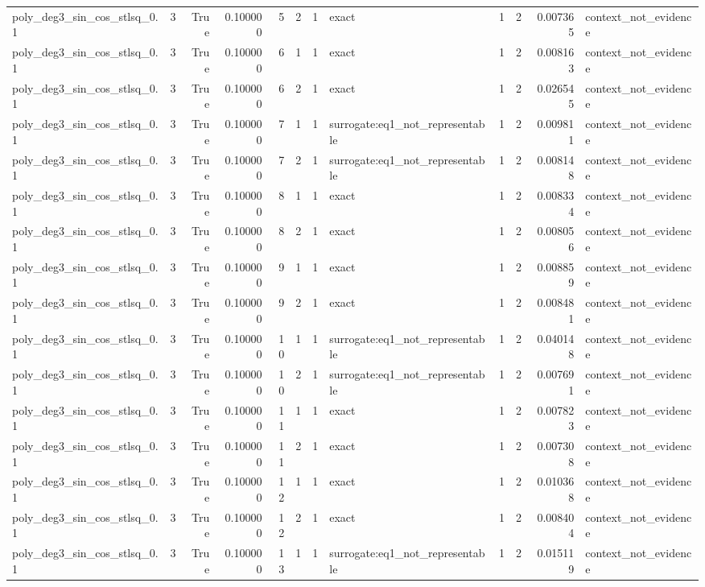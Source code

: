 \begin{tabular}{lrrrrrrlrrrl}
poly\_deg3\_sin\_cos\_stlsq\_0.1 & 3 & True & 0.100000 & 5 & 2 & 1 & exact & 1 & 2 & 0.007365 & context\_not\_evidence \\
poly\_deg3\_sin\_cos\_stlsq\_0.1 & 3 & True & 0.100000 & 6 & 1 & 1 & exact & 1 & 2 & 0.008163 & context\_not\_evidence \\
poly\_deg3\_sin\_cos\_stlsq\_0.1 & 3 & True & 0.100000 & 6 & 2 & 1 & exact & 1 & 2 & 0.026545 & context\_not\_evidence \\
poly\_deg3\_sin\_cos\_stlsq\_0.1 & 3 & True & 0.100000 & 7 & 1 & 1 & surrogate:eq1\_not\_representable & 1 & 2 & 0.009811 & context\_not\_evidence \\
poly\_deg3\_sin\_cos\_stlsq\_0.1 & 3 & True & 0.100000 & 7 & 2 & 1 & surrogate:eq1\_not\_representable & 1 & 2 & 0.008148 & context\_not\_evidence \\
poly\_deg3\_sin\_cos\_stlsq\_0.1 & 3 & True & 0.100000 & 8 & 1 & 1 & exact & 1 & 2 & 0.008334 & context\_not\_evidence \\
poly\_deg3\_sin\_cos\_stlsq\_0.1 & 3 & True & 0.100000 & 8 & 2 & 1 & exact & 1 & 2 & 0.008056 & context\_not\_evidence \\
poly\_deg3\_sin\_cos\_stlsq\_0.1 & 3 & True & 0.100000 & 9 & 1 & 1 & exact & 1 & 2 & 0.008859 & context\_not\_evidence \\
poly\_deg3\_sin\_cos\_stlsq\_0.1 & 3 & True & 0.100000 & 9 & 2 & 1 & exact & 1 & 2 & 0.008481 & context\_not\_evidence \\
poly\_deg3\_sin\_cos\_stlsq\_0.1 & 3 & True & 0.100000 & 10 & 1 & 1 & surrogate:eq1\_not\_representable & 1 & 2 & 0.040148 & context\_not\_evidence \\
poly\_deg3\_sin\_cos\_stlsq\_0.1 & 3 & True & 0.100000 & 10 & 2 & 1 & surrogate:eq1\_not\_representable & 1 & 2 & 0.007691 & context\_not\_evidence \\
poly\_deg3\_sin\_cos\_stlsq\_0.1 & 3 & True & 0.100000 & 11 & 1 & 1 & exact & 1 & 2 & 0.007823 & context\_not\_evidence \\
poly\_deg3\_sin\_cos\_stlsq\_0.1 & 3 & True & 0.100000 & 11 & 2 & 1 & exact & 1 & 2 & 0.007308 & context\_not\_evidence \\
poly\_deg3\_sin\_cos\_stlsq\_0.1 & 3 & True & 0.100000 & 12 & 1 & 1 & exact & 1 & 2 & 0.010368 & context\_not\_evidence \\
poly\_deg3\_sin\_cos\_stlsq\_0.1 & 3 & True & 0.100000 & 12 & 2 & 1 & exact & 1 & 2 & 0.008404 & context\_not\_evidence \\
poly\_deg3\_sin\_cos\_stlsq\_0.1 & 3 & True & 0.100000 & 13 & 1 & 1 & surrogate:eq1\_not\_representable & 1 & 2 & 0.015119 & context\_not\_evidence \\

\end{tabular}
